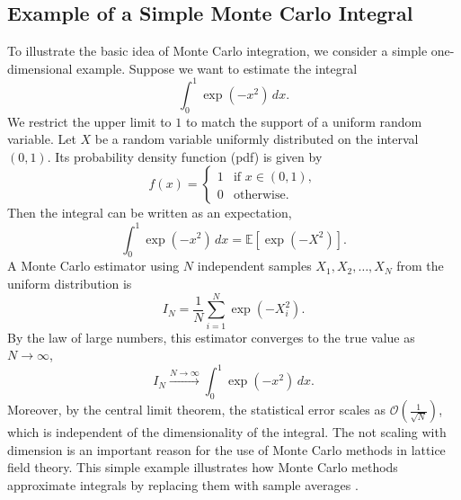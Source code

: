\subsection{Example of a Simple Monte Carlo Integral}
To illustrate the basic idea of Monte Carlo integration, we consider a simple one-dimensional example. Suppose we want to estimate the integral
\begin{equation}
\int_0^1 \exp(-x^2) \, dx.
\end{equation}
We restrict the upper limit to $1$ to match the support of a uniform random variable. Let $X$ be a random variable uniformly distributed on the interval $(0,1)$. Its probability density function (pdf) is given by
\begin{equation}
f(x) = 
\begin{cases}
1 & \text{if } x \in (0,1), \\
0 & \text{otherwise}.
\end{cases}
\end{equation}
Then the integral can be written as an expectation, 
\begin{equation}
\int_0^1 \exp(-x^2) \, dx = \mathbb{E}[\exp(-X^2)].
\end{equation}
A Monte Carlo estimator using $N$ independent samples $X_1, X_2, \dots, X_N$ from the uniform distribution is
\begin{equation}
I_N = \frac{1}{N} \sum_{i=1}^N \exp(-X_i^2).
\end{equation}
By the law of large numbers, this estimator converges to the true value as $N \to \infty$, 
\[
I_N \xrightarrow[]{N \to \infty} \int_0^1 \exp(-x^2) \, dx.
\]
Moreover, by the central limit theorem, the statistical error scales as $\mathcal{O}\left( \frac{1}{\sqrt{N}}\right)$, which is independent of the dimensionality of the integral. The not scaling with dimension is an important reason for the use of Monte Carlo methods in lattice field theory. This simple example illustrates how Monte Carlo methods approximate integrals by replacing them with sample averages \cite{Monte_carlo}.
